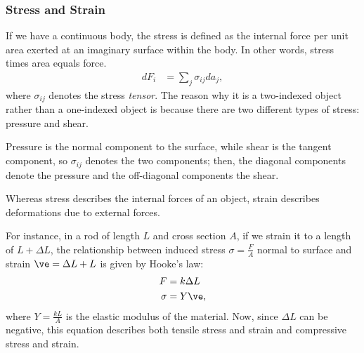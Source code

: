 \documentclass[10pt]{mypackage}
\begin{document}
  \subsubsection{Stress and Strain}%
  If we have a continuous body, the stress is defined as the internal force per unit area exerted at an imaginary surface within the body. In other words, stress times area equals force.
  \begin{align*}
    dF_i &= \sum_{j}\sigma_{ij}da_j,
  \end{align*}
  where $\sigma_{ij}$ denotes the stress \textit{tensor}. The reason why it is a two-indexed object rather than a one-indexed object is because there are two different types of stress: pressure and shear.\newline

  Pressure is the normal component to the surface, while shear is the tangent component, so $\sigma_{ij}$ denotes the two components; then, the diagonal components denote the pressure and the off-diagonal components the shear.\newline

  Whereas stress describes the internal forces of an object, strain describes deformations due to external forces.\newline

  For instance, in a rod of length $L$ and cross section $A$, if we strain it to a length of $L + \Delta L$, the relationship between induced stress $\sigma = \frac{F}{A}$ normal to surface and strain $\ve = \Delta L + L$ is given by Hooke's law:
  \begin{align*}
    F &= k\Delta L\\
    \sigma &= Y\ve,
  \end{align*}
  where $Y = \frac{kL}{A}$ is the elastic modulus of the material. Now, since $\Delta L$ can be negative, this equation describes both tensile stress and strain and compressive stress and strain.\newline
\end{document}
